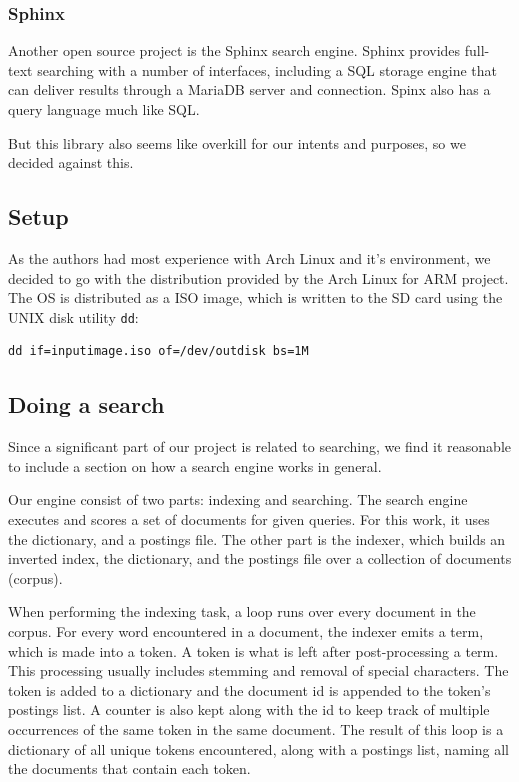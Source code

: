 \subsubsection{Sphinx}
Another open source project is the Sphinx search engine\cite{sphinx}. Sphinx provides full-text searching with a number of interfaces, including a SQL storage engine that can deliver results through a MariaDB server and connection. Spinx also has a query language much like SQL.

But this library also seems like overkill for our intents and purposes, so we decided against this.

\subsection{Setup}
As the authors had most experience with Arch Linux and it's environment, we decided to go with the distribution provided by the Arch Linux for ARM project.
The OS is distributed as a ISO image, which is written to the SD card using the UNIX disk utility {\tt dd}:
\begin{lstlisting}
dd if=inputimage.iso of=/dev/outdisk bs=1M
\end{lstlisting}

\subsection{Doing a search}
Since a significant part of our project is related to searching, we find it reasonable to include a section on how a search engine works in general.

Our engine consist of two parts: indexing and searching.
The search engine executes and scores a set of documents for given queries. For this work, it uses the dictionary, and a postings file.
The other part is the indexer, which builds an inverted index, the dictionary, and the postings file\cite{IntroIR} over a collection of documents (corpus).

When performing the indexing task, a loop runs over every document in the corpus.
For every word encountered in a document, the indexer emits a term, which is made into a token.
A token is what is left after post-processing a term. This processing usually includes stemming and removal of special characters.
The token is added to a dictionary and the document id is appended to the token's postings list. A counter is also kept along with the id to keep track of multiple occurrences of the same token in the same document.
The result of this loop is a dictionary of all unique tokens encountered, along with a postings list, naming all the documents that contain each token.

